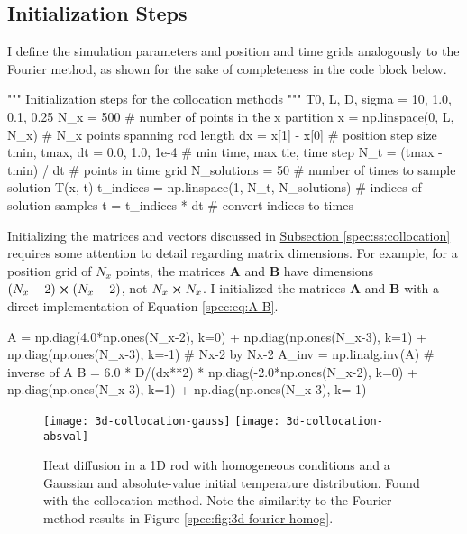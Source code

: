 \documentclass[11pt, a4paper]{article}
\newcommand{\mat}[1]{\mathbf{#1}}
\begin{document}
\subsection{Initialization Steps}
I define the simulation parameters and position and time grids analogously to the Fourier method, as shown for the sake of completeness in the code block below.
\begin{python}
""" Initialization steps for the collocation methods """
T0, L, D, sigma = 10, 1.0, 0.1, 0.25
N_x = 500  # number of points in the x partition
x = np.linspace(0, L, N_x)       # N_x points spanning rod length
dx = x[1] - x[0]                 # position step size
tmin, tmax, dt = 0.0, 1.0, 1e-4  # min time, max tie, time step
N_t = (tmax - tmin) / dt         # points in time grid
N_solutions = 50  # number of times to sample solution T(x, t)
t_indices = np.linspace(1, N_t, N_solutions)  # indices of solution samples
t = t_indices * dt                            # convert indices to times
\end{python}
Initializing the matrices and vectors discussed in \hyperref[spec:ss:collocation]{Subsection \ref{spec:ss:collocation}} requires some attention to detail regarding matrix dimensions. For example, for a position grid of $ N_{x} $ points, the matrices $ \mat{A} $ and $ \mat{B} $ have dimensions $ (N_{x}-2)\cross(N_{x}-2) $, not $ N_{x} \cross N_{x} $. I initialized the matrices $ \mat{A} $ and $ \mat{B} $ with a direct implementation of Equation \ref{spec:eq:A-B}.
\begin{python}
A = np.diag(4.0*np.ones(N_x-2), k=0) + np.diag(np.ones(N_x-3), k=1) + np.diag(np.ones(N_x-3), k=-1)  # Nx-2 by Nx-2
A_inv = np.linalg.inv(A)  # inverse of A
B = 6.0 * D/(dx**2) * np.diag(-2.0*np.ones(N_x-2), k=0) + np.diag(np.ones(N_x-3), k=1) + np.diag(np.ones(N_x-3), k=-1)
\end{python}


\begin{figure}
\centering
\texttt{[image: 3d-collocation-gauss]} \hfill
\texttt{[image: 3d-collocation-absval]}
\caption{Heat diffusion in a 1D rod with homogeneous conditions and a Gaussian and absolute-value initial temperature distribution. Found with the collocation method. Note the similarity to the Fourier method results in Figure \ref{spec:fig:3d-fourier-homog}.}
\label{spec:fig:3d-collocation}
\end{figure}
\end{document}
